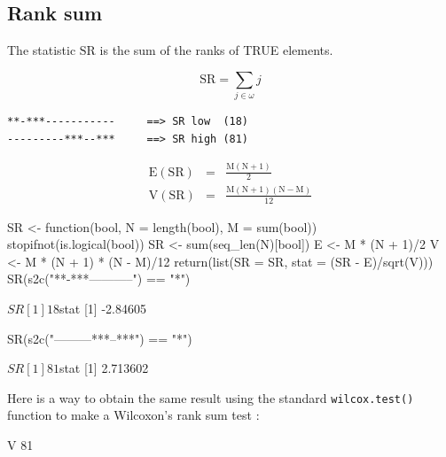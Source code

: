 \documentclass{article}
\begin{document}
\subsection{Rank sum}

The statistic $\mathrm{SR}$ is the sum of the ranks of TRUE elements.

$$
\mathrm{SR} = \sum_{j \in \omega}{j}
$$

\begin{verbatim}
**-***-----------     ==> SR low  (18)
---------***--***     ==> SR high (81)
\end{verbatim}

\begin{eqnarray*}
\mathrm{E(SR)} & = & \mathrm{\frac{M(N + 1)}{2}} \\
\mathrm{V(SR)} & = & \mathrm{\frac{M(N + 1)(N - M)}{12}}
\end{eqnarray*}


\begin{Schunk}
\begin{Sinput}
 SR <- function(bool, N = length(bool), M = sum(bool)) {
     stopifnot(is.logical(bool))
     SR <- sum(seq_len(N)[bool])
     E <- M * (N + 1)/2
     V <- M * (N + 1) * (N - M)/12
     return(list(SR = SR, stat = (SR - E)/sqrt(V)))
 }
 SR(s2c("**-***-----------") == "*")
\end{Sinput}
\begin{Soutput}
$SR
[1] 18

$stat
[1] -2.84605
\end{Soutput}
\begin{Sinput}
 SR(s2c("---------***--***") == "*")
\end{Sinput}
\begin{Soutput}
$SR
[1] 81

$stat
[1] 2.713602
\end{Soutput}
\end{Schunk}

Here is a way to obtain the same result using the standard \Rlogo{} \texttt{wilcox.test()}
function to make a Wilcoxon's rank sum test \cite{WilcoxonF1945}:

\begin{Schunk}
\begin{Soutput}
 V 
81 
\end{Soutput}
\end{Schunk}
\end{document}
